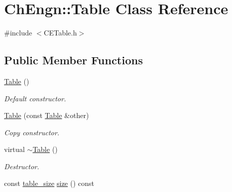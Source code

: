 \hypertarget{classChEngn_1_1Table}{
\section{ChEngn::Table Class Reference}
\label{classChEngn_1_1Table}
}


{\ttfamily \#include $<$CETable.h$>$}

\subsection*{Public Member Functions}
\begin{DoxyCompactItemize}
\item 
\hypertarget{classChEngn_1_1Table_acca1b7e7ea3e28fc5aa33e3efd71dcd1}{
\hyperlink{classChEngn_1_1Table_acca1b7e7ea3e28fc5aa33e3efd71dcd1}{Table} ()}
\label{classChEngn_1_1Table_acca1b7e7ea3e28fc5aa33e3efd71dcd1}

\begin{DoxyCompactList}\small\item\em Default constructor. \item\end{DoxyCompactList}\item 
\hyperlink{classChEngn_1_1Table_a9ccad112470efda3d3b6cfe55341bf01}{Table} (const \hyperlink{classChEngn_1_1Table}{Table} \&other)
\begin{DoxyCompactList}\small\item\em Copy constructor. \item\end{DoxyCompactList}\item 
\hypertarget{classChEngn_1_1Table_a11ecbf5aaa43cf800da3ccf1a8a20515}{
virtual \hyperlink{classChEngn_1_1Table_a11ecbf5aaa43cf800da3ccf1a8a20515}{$\sim$Table} ()}
\label{classChEngn_1_1Table_a11ecbf5aaa43cf800da3ccf1a8a20515}

\begin{DoxyCompactList}\small\item\em Destructor. \item\end{DoxyCompactList}\item 
\hypertarget{classChEngn_1_1Table_a450e753570d02411899db0e0eb597a85}{
const \hyperlink{structChEngn_1_1table__size}{table\_\-size} \hyperlink{classChEngn_1_1Table_a450e753570d02411899db0e0eb597a85}{size} () const }
\label{classChEngn_1_1Table_a450e753570d02411899db0e0eb597a85}


\end{DoxyCompactItemize}
